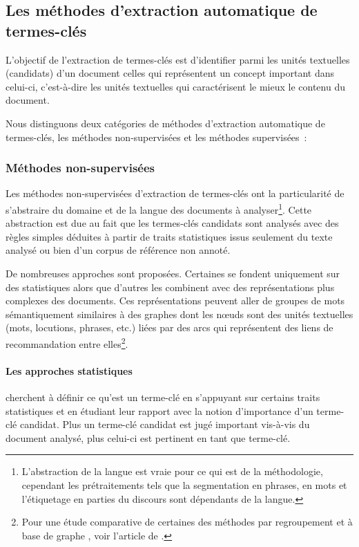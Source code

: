     \subsection{Les méthodes d'extraction automatique de termes-clés}
    \label{sec:methods}
      L'objectif de l'extraction de termes-clés est d'identifier parmi les
      unités textuelles (candidats) d'un document celles qui représentent un
      concept important dans celui-ci, c'est-à-dire les unités textuelles qui
      caractérisent le mieux le contenu du document.

      Nous distinguons deux catégories de méthodes d'extraction automatique de
      termes-clés, les méthodes non-supervisées et les méthodes supervisées~:

      \subsubsection{Méthodes non-supervisées}
      \label{sec:unsupervised_methods}
        Les méthodes non-supervisées d'extraction de termes-clés ont la
        particularité de s'abstraire du domaine et de la langue des documents à
        analyser\footnote{L'abstraction de la langue est vraie pour ce qui est
        de la méthodologie, cependant les prétraitements tels que la
        segmentation en phrases, en mots et l'étiquetage en parties du discours
        sont dépendants de la langue.}. Cette abstraction est due au fait que
        les termes-clés candidats sont analysés avec des règles simples déduites
        à partir de traits statistiques issus seulement du texte analysé ou bien
        d'un corpus de référence non annoté.

        De nombreuses approches sont proposées. Certaines se fondent uniquement
        sur des statistiques alors que d'autres les combinent avec des
        représentations plus complexes des documents. Ces représentations
        peuvent aller de groupes de mots sémantiquement similaires à des graphes
        dont les n\oe{}uds sont des unités textuelles (mots, locutions, phrases,
        etc.) liées par des arcs qui représentent des liens de recommandation
        entre elles\footnote{Pour une étude comparative de certaines des
        méthodes par regroupement \citep{liu2009keycluster} et à base de graphe
        \citep{mihalcea2004textrank, wan2008expandrank}, voir l'article de
        \citet{hassan2010conundrums}.}.

        \paragraph{Les approches statistiques}
          cherchent à définir ce qu'est un terme-clé en s'appuyant sur certains
          traits statistiques et en étudiant leur rapport avec la notion
          d'importance d'un terme-clé candidat. Plus un terme-clé candidat est
          jugé important vis-à-vis du document analysé, plus celui-ci est
          pertinent en tant que terme-clé.

